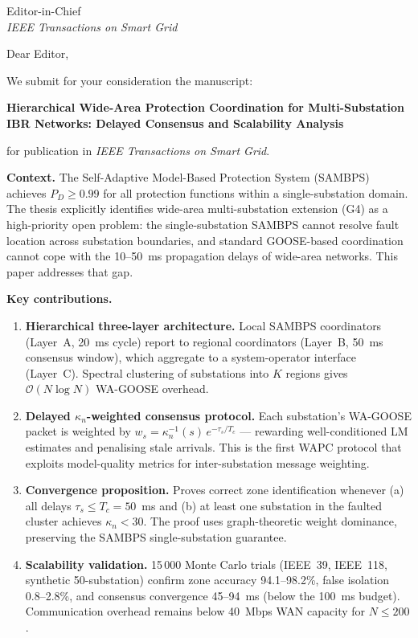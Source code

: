 \documentclass[11pt,a4paper]{letter}
\begin{document}
\begin{letter}{Editor-in-Chief\\
               \textit{IEEE Transactions on Smart Grid}}

\opening{Dear Editor,}

We submit for your consideration the manuscript:

\begin{center}
  \textbf{Hierarchical Wide-Area Protection Coordination for Multi-Substation
  IBR Networks: Delayed Consensus and Scalability Analysis}
\end{center}

\noindent for publication in \textit{IEEE Transactions on Smart Grid}.

\medskip
\noindent\textbf{Context.}
The Self-Adaptive Model-Based Protection System (SAMBPS) achieves $P_D \geq 0.99$
for all protection functions within a single-substation domain.  The thesis
explicitly identifies wide-area multi-substation extension (G4) as a high-priority
open problem: the single-substation SAMBPS cannot resolve fault location across
substation boundaries, and standard GOOSE-based coordination cannot cope with the
10--50~ms propagation delays of wide-area networks.  This paper addresses that gap.

\medskip
\noindent\textbf{Key contributions.}
\begin{enumerate}
  \item \textbf{Hierarchical three-layer architecture.}
        Local SAMBPS coordinators (Layer~A, 20~ms cycle) report to regional
        coordinators (Layer~B, 50~ms consensus window), which aggregate to a
        system-operator interface (Layer~C).  Spectral clustering of substations
        into $K$ regions gives $\mathcal{O}(N\log N)$ WA-GOOSE overhead.
  \item \textbf{Delayed $\kappa_n$-weighted consensus protocol.}
        Each substation's WA-GOOSE packet is weighted by $w_s =
        \kappa_n^{-1}(s)\,e^{-\tau_s/T_c}$ — rewarding well-conditioned LM
        estimates and penalising stale arrivals.  This is the first WAPC
        protocol that exploits model-quality metrics for inter-substation message
        weighting.
  \item \textbf{Convergence proposition.}
        Proves correct zone identification whenever (a) all delays $\tau_s \leq
        T_c = 50$~ms and (b) at least one substation in the faulted cluster
        achieves $\kappa_n < 30$.  The proof uses graph-theoretic weight
        dominance, preserving the SAMBPS single-substation guarantee.
  \item \textbf{Scalability validation.}
        15\,000 Monte Carlo trials (IEEE~39, IEEE~118, synthetic 50-substation)
        confirm zone accuracy 94.1--98.2\%, false isolation 0.8--2.8\%, and
        consensus convergence 45--94~ms (below the 100~ms budget).
        Communication overhead remains below 40~Mbps WAN capacity for $N \leq 200$.
\end{enumerate}


\end{letter}
\end{document}

